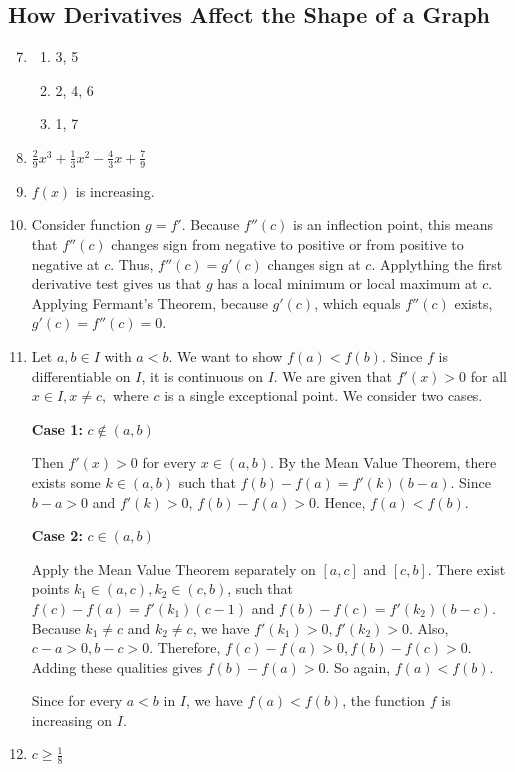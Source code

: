 \documentclass{article}
\begin{document}
\subsection{How Derivatives Affect the Shape of a Graph}
\begin{enumerate}
    \setcounter{enumi}{6}
  \item
    \begin{enumerate}
      \item 3, 5
      \item 2, 4, 6
      \item 1, 7
    \end{enumerate}
    \setcounter{enumi}{58}
  \item $\frac{2}{9}x^{3}+\frac{1}{3}x^{2}-\frac{4}{3}x+\frac{7}{9}$
    \setcounter{enumi}{56}
  \item $f(x)$ is increasing.
    \setcounter{enumi}{70}
  \item Consider function $g=f'$. Because $f''(c)$ is an inflection point, this means that $f''(c)$
    changes sign from negative to positive or from positive to negative at $c$. Thus, $f''(c)=g'(c)$
    changes sign at $c$. Applything the first derivative test gives us that $g$ has a local minimum
    or local maximum at $c$. Applying Fermant's Theorem, because $g'(c)$, which equals $f''(c)$
    exists, $g'(c)=f''(c)=0$.
    \setcounter{enumi}{74}
  \item Let $a,b\in I$ with $a<b$. We want to show $f(a)<f(b)$. Since $f$ is differentiable on $I$,
    it is continuous on $I$. We are given that $f'(x)>0$ for all $x\in I, x\ne c,$ where $c$ is a
    single exceptional point. We consider two cases.

    \textbf{Case 1:} $c\notin(a, b)$

    Then $f'(x)>0$ for every $x\in(a, b)$. By the Mean Value Theorem, there exists some $k\in(a,b)$
    such that $f(b)-f(a)=f'(k)(b-a)$. Since $b-a>0$ and $f'(k)>0$, $f(b)-f(a)>0$. Hence,
    $f(a)<f(b)$.

    \textbf{Case 2:} $c\in(a, b)$

    Apply the Mean Value Theorem separately on $[a, c]$ and $[c, b]$. There exist points $k_1\in(a,
    c), k_2\in(c, b)$, such that $f(c)-f(a)=f'(k_1)(c-1)$ and $f(b)-f(c)=f'(k_2)(b-c)$. Because $k_1
    \ne c$ and $k_2\ne c$, we have $f'(k_1)>0, f'(k_2)>0$. Also, $c-a>0, b-c>0$. Therefore, $f(c)-
    f(a)>0, f(b)-f(c)>0$. Adding these qualities gives $f(b)-f(a)>0$. So again, $f(a)<f(b)$.

    Since for every $a<b$ in $I$, we have $f(a)<f(b)$, the function $f$ is increasing on $I$.
  \item $c\ge\frac{1}{8}$
\end{enumerate}
\end{document}
